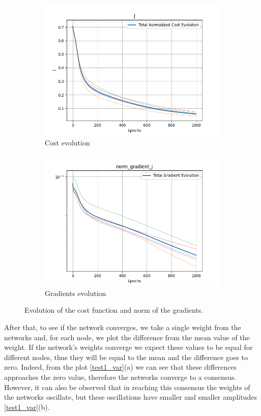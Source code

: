 \documentclass[a4paper,11pt,oneside]{book}
\begin{document}
\begin{figure}[h]
\centering
	\begin{subfigure}{0.49\textwidth}	
	\includegraphics[scale=0.43]{figs/test1/J.png}
	\caption{Cost evolution}
	\end{subfigure}
\hfill
	\begin{subfigure}{0.49\textwidth}	
	\includegraphics[scale=0.43]{figs/test1/norm_gradient_J.png}
	\caption{Gradients evolution}
	\end{subfigure}
\caption{Evolution of the cost function and norm of the gradients.}
\label{test1_loss}
\end{figure}

After that, to see if the network converges, we take a single weight from the networks and, for each node, we plot the difference from the mean value of the weight. If the network's weights converge we expect these values to be equal for different nodes, thus they will be equal to the mean and the difference goes to zero. Indeed, from the plot \ref{test1_var}(a) we can see that these differences approaches the zero value, therefore the networks converge to a consensus. However, it can also be observed that in reaching this consensus the weights of the networks oscillate, but these oscillations have smaller and smaller amplitudes \ref{test1_var}(b).
\end{document}
